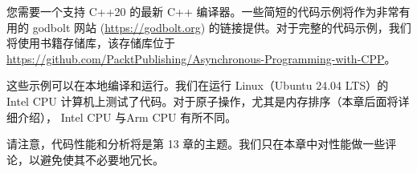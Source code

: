 您需要一个支持 C++20 的最新 C++ 编译器。一些简短的代码示例将作为非常有用的 godbolt 网站 (\url{https://godbolt.org}) 的链接提供。对于完整的代码示例，我们将使用书籍存储库，该存储库位于 \url{https://github.com/PacktPublishing/Asynchronous-Programming-with-CPP}。

这些示例可以在本地编译和运行。我们在运行 Linux（Ubuntu 24.04 LTS）的 Intel CPU 计算机上测试了代码。对于原子操作，尤其是内存排序（本章后面将详细介绍）， Intel CPU 与Arm CPU 有所不同。

请注意，代码性能和分析将是第 13 章的主题。我们只在本章中对性能做一些评论，以避免使其不必要地冗长。

